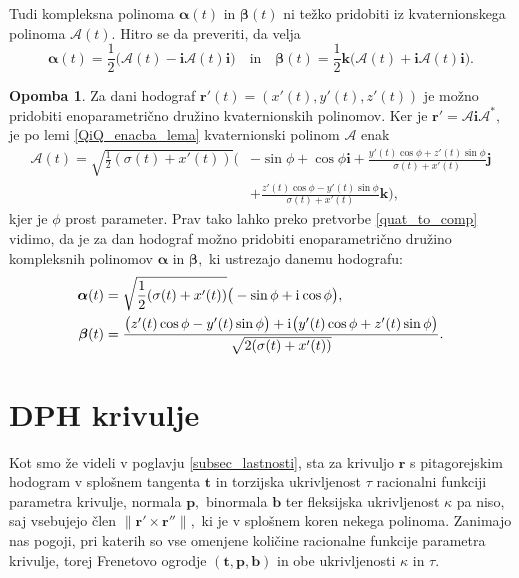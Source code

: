 \documentclass[12pt,a4paper,twoside]{article}
\newcommand{\iu}{\mathrm{i}\mkern1mu} %
\theoremstyle{definition} %
\newtheorem{opomba}[definicija]{Opomba}
\theoremstyle{plain} %
\theoremstyle{primerstyle}
\numberwithin{equation}{section}  %
\newcommand{\tV}{\mathbf{t}}
\newcommand{\bV}{\mathbf{b}}
\newcommand{\pV}{\mathbf{p}}
\newcommand{\rV}{\mathbf{r}}
\newcommand{\iV}{\mathbf{i}}
\newcommand{\jV}{\mathbf{j}}
\newcommand{\kV}{\mathbf{k}}
\newcommand{\AQ}{\mathcal{A}}
\newcommand{\balpha}{\boldsymbol \alpha}
\newcommand{\bbeta}{\boldsymbol \beta}
\begin{document}
Tudi kompleksna polinoma $\balpha(t)$ in $\bbeta(t)$ ni težko pridobiti iz kvaternionskega polinoma $\AQ(t).$ Hitro se da preveriti, da velja
\begin{equation}
	\label{quat_to_comp}
		\balpha(t) = \frac{1}{2}\big(\AQ(t)-\iV\AQ(t)\iV\big) \quad \text{in} \quad \bbeta(t)= \frac{1}{2}\kV\big(\AQ(t)+\iV\AQ(t)\iV\big).
\end{equation}

\begin{opomba}
	Za dani hodograf $\rV'(t)=(x'(t),y'(t),z'(t))$ je možno pridobiti enoparametrično družino kvaternionskih polinomov. Ker je $\rV'=\AQ\iV\AQ^*,$ je po lemi \ref{QiQ_enacba_lema} kvaternionski polinom $\AQ$ enak
	\begin{align*}
		\AQ(t)=\sqrt{\frac{1}{2}(\sigma(t)+x'(t))}\Big(&-\sin\phi+\cos\phi\iV+\frac{y'(t)\cos\phi+z'(t)\sin\phi}{\sigma(t)+x'(t)}\jV\\
		&+\frac{z'(t)\cos\phi-y'(t)\sin\phi}{\sigma(t)+x'(t)}\kV\Big),
	\end{align*}
	kjer je $\phi$ prost parameter. Prav tako lahko preko pretvorbe \eqref{quat_to_comp} vidimo, da je za dan hodograf možno pridobiti enoparametrično družino kompleksnih polinomov $\balpha$ in $\bbeta,$ ki ustrezajo danemu hodografu:
	\begin{align*}
		\balpha(t)&=\sqrt{\frac{1}{2}(\sigma(t)+x'(t))}\big(-\sin\phi+\iu\cos\phi\big),\\
		\bbeta(t)&=\frac{\big(z'(t)\cos\phi-y'(t)\sin\phi\big)+\iu\big(y'(t)\cos\phi+z'(t)\sin\phi\big)}{\sqrt{2(\sigma(t)+x'(t))}}.
	\end{align*}
\end{opomba}
\clearpage
\section{DPH krivulje}

Kot smo že videli v poglavju \ref{subsec_lastnosti}, sta za krivuljo $\rV$ s pitagorejskim hodogram v splošnem tangenta $\tV$ in torzijska ukrivljenost $\tau$ racionalni funkciji parametra krivulje, normala $\pV,$ binormala $\bV$ ter fleksijska ukrivljenost $\kappa$ pa niso, saj vsebujejo člen $\lVert \rV' \times \rV'' \rVert,$ ki je v splošnem koren nekega polinoma. Zanimajo nas pogoji, pri katerih so vse omenjene količine racionalne funkcije parametra krivulje, torej Frenetovo ogrodje $(\tV,\pV,\bV)$ in obe ukrivljenosti $\kappa$ in $\tau.$
\end{document}

